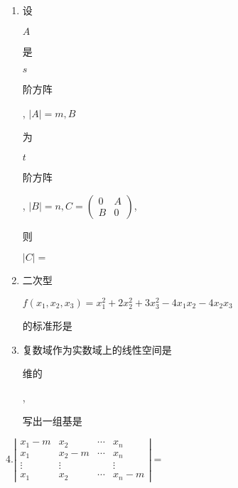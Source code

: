 \documentclass[10pt]{article}
\begin{document}
\begin{enumerate}
  \item \begin{CJK}{UTF8}{mj}设\end{CJK} $A$ \begin{CJK}{UTF8}{mj}是\end{CJK} $s$ \begin{CJK}{UTF8}{mj}阶方阵\end{CJK}, $|A|=m, B$ \begin{CJK}{UTF8}{mj}为\end{CJK} $t$ \begin{CJK}{UTF8}{mj}阶方阵\end{CJK}, $|B|=n, C=\left(\begin{array}{cc}0 & A \\ B & 0\end{array}\right)$, \begin{CJK}{UTF8}{mj}则\end{CJK} $|C|=$

  \item \begin{CJK}{UTF8}{mj}二次型\end{CJK} $f\left(x_{1}, x_{2}, x_{3}\right)=x_{1}^{2}+2 x_{2}^{2}+3 x_{3}^{2}-4 x_{1} x_{2}-4 x_{2} x_{3}$ \begin{CJK}{UTF8}{mj}的标准形是\end{CJK}

  \item \begin{CJK}{UTF8}{mj}复数域作为实数域上的线性空间是\end{CJK} \begin{CJK}{UTF8}{mj}维的\end{CJK}, \begin{CJK}{UTF8}{mj}写出一组基是\end{CJK}

\end{enumerate}
$4 .\left|\begin{array}{cccc}x_{1}-m & x_{2} & \cdots & x_{n} \\ x_{1} & x_{2}-m & \cdots & x_{n} \\ \vdots & \vdots & & \vdots \\ x_{1} & x_{2} & \cdots & x_{n}-m\end{array}\right|=$
\end{document}
